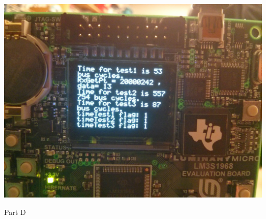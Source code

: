 \documentclass[11pt]{article}
\begin{document}
  \centerline{\includegraphics[width=1\textwidth]{lab2_partDoled}\\[.25in]}
  Part D\\
\end{document}
